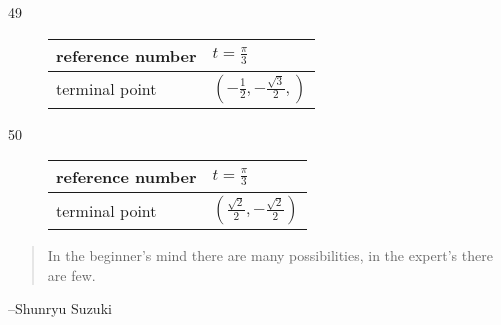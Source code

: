 \documentclass{exam}
\begin{document}
\begin{description}
      \item[49]
        \begin{tabular}[H]{ll}
          \toprule
          reference number & $t = \frac{\pi}{3}$ \\
          \midrule
          terminal point   & $\left( - \frac{1}{2}, - \frac{\sqrt{3}}{2},  \right)$ \\
          \bottomrule
        \end{tabular}

      \item[50]
        \begin{tabular}[H]{ll}
          \toprule
          reference number & $t = \frac{\pi}{3}$ \\
          \midrule
          terminal point   & $\left( \frac{\sqrt{2}}{2}, - \frac{\sqrt{2}}{2} \right)$ \\
          \bottomrule
        \end{tabular}

    \end{description}
  \else
    \vspace{9 cm}
    \begin{quote}
      \begin{em}
        In the beginner's mind there are many possibilities, in the expert's there are few. 
      \end{em}
    \end{quote}
    \hspace{1 cm} --Shunryu Suzuki
  \fi
\end{document}
